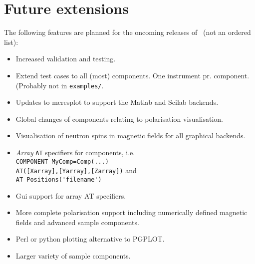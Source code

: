 \section{Future extensions}
\label{s:future}
The following features are planned for the oncoming releases of \MCS\
(not an ordered list):
\begin{itemize}
\item Increased validation and testing.
\item Extend test cases to all (most) components. One instrument
  pr. component. (Probably not in \verb+examples/+.
\item Updates to mcresplot to support the Matlab and Scilab backends.
\item Global changes of components relating to polarisation
  visualisation.
\item Visualisation of neutron spins in magnetic fields for all
  graphical backends.
\item \emph{Array} \verb+AT+ specifiers for components, i.e. \\
  \verb+COMPONENT MyComp=Comp(...)+\\\verb+AT([Xarray],[Yarray],[Zarray])+ and\\
  \verb+AT Positions('filename')+
\item Gui support for array AT specifiers.
\item More complete polarisation support including numerically defined
  magnetic fields and advanced sample components.
\item Perl or python plotting alternative to PGPLOT.
\item Larger variety of sample components.
\end{itemize}








